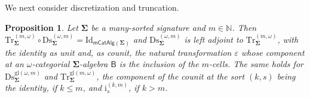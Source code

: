 \documentclass[a4paper, reqno
]{amsart}
\newcommand{\sig}[1]{\mathbf{#1}}             %
\newcommand{\calg}[1]{\boldsymbol{\mathsf{#1}}} %
\newcommand{\Id}{\mathrm{Id}}
\newcommand{\gl}{\mathrm{gl}}                %
\newcommand{\Ds}{\mathrm{Ds}}
\newcommand{\Tr}{\mathrm{Tr}}
\theoremstyle{plain}
\newtheorem{proposition}[theorem]{Proposition}
\theoremstyle{definition}
\begin{document}
We next consider discretization and truncation.

\begin{proposition}\label{POmegaDiscTrunc}
Let $\sig{\Sigma}$ be a many-sorted signature and $m\in\mathbb{N}$.
Then $\Tr^{(m,\omega)}_{\sig{\Sigma}}\circ\Ds^{(\omega,m)}_{\sig{\Sigma}}=\Id_{\mathsf{mCatAlg}(\sig{\Sigma})}$ and $\Ds^{(\omega,m)}_{\sig{\Sigma}}$ is left adjoint to $\Tr^{(m,\omega)}_{\sig{\Sigma}}$, with the identity as unit and, as counit, the natural transformation $\varepsilon$ whose component at an $\omega$-categorial $\sig{\Sigma}$-algebra $\calg{B}$ is the inclusion of the $m$-cells.
The same holds for $\Ds^{\gl(\omega,m)}_{\sig{\Sigma}}$ and $\Tr^{\gl(m,\omega)}_{\sig{\Sigma}}$, the component of the counit at the sort $(k,s)$ being the identity, if $k\leq m$, and $\mathrm{i}^{(k,m)}_{s}$, if $k>m$.
\end{proposition}
\end{document}
